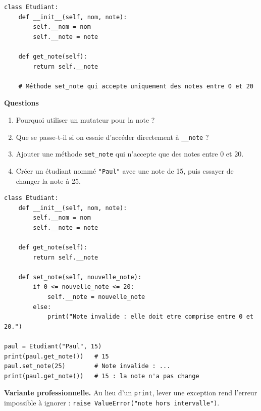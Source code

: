 \documentclass[11pt,a4paper]{article}
\newif\ifcorrige
\newcommand{\py}[1]{\texttt{#1}}
\newcommand{\rep}[1]{%
  \ifcorrige
    \par\smallskip{\color{corr}\small#1}\par\smallskip
  \else
    \par\nobreak\vspace{1mm}\noindent\color{black!55}\dotfill\par
    \noindent\color{black!55}\dotfill\par\color{black}\vspace{1mm}
  \fi}
\newcommand{\zonecode}[1][4cm]{%
  \ifcorrige\else
    \par\smallskip\noindent
    \begin{tcolorbox}[colback=white,colframe=black!45,boxrule=0.5pt,arc=1pt,height=#1]\end{tcolorbox}%
  \fi}
\newenvironment{solution}
  {\ifcorrige
     \begin{tcolorbox}[enhanced,breakable,colback=corrbg,colframe=corr,boxrule=0.6pt,arc=1pt,
       left=5pt,right=5pt,top=4pt,bottom=4pt,
       title={Corrigé},coltitle=corr,fonttitle=\bfseries\small,detach title,
       before upper={\tcbtitle\par\smallskip},fontupper=\small]%
   \else
     \setbox0\vbox\bgroup
   \fi}
  {\ifcorrige\end{tcolorbox}\else\egroup\fi}
\begin{document}
\begin{lstlisting}
class Etudiant:
    def __init__(self, nom, note):
        self.__nom = nom
        self.__note = note

    def get_note(self):
        return self.__note

    # Méthode set_note qui accepte uniquement des notes entre 0 et 20
\end{lstlisting}

\textbf{Questions}
\begin{enumerate}
  \item Pourquoi utiliser un mutateur pour la note ?
    \rep{Pour garantir un \emph{invariant} : une note reste comprise entre 0 et 20. Le mutateur
    est le seul point d'entrée en écriture, il peut donc vérifier la valeur avant de
    l'enregistrer et refuser les valeurs incohérentes.}
  \item Que se passe-t-il si on essaie d'accéder directement à \py{__note} ?
    \rep{Python lève une \py{AttributeError} : à cause du \emph{name mangling}, l'attribut
    s'appelle en réalité \py{_Etudiant__note} et le nom \py{__note} n'existe pas depuis
    l'extérieur.}
  \item Ajouter une méthode \py{set_note} qui n'accepte que des notes entre 0 et 20.
  \item Créer un étudiant nommé \py{"Paul"} avec une note de 15, puis essayer de changer la note
    à 25.
\end{enumerate}
\zonecode[5.5cm]
\begin{solution}
\begin{lstlisting}
class Etudiant:
    def __init__(self, nom, note):
        self.__nom = nom
        self.__note = note

    def get_note(self):
        return self.__note

    def set_note(self, nouvelle_note):
        if 0 <= nouvelle_note <= 20:
            self.__note = nouvelle_note
        else:
            print("Note invalide : elle doit etre comprise entre 0 et 20.")

paul = Etudiant("Paul", 15)
print(paul.get_note())   # 15
paul.set_note(25)        # Note invalide : ...
print(paul.get_note())   # 15 : la note n'a pas change
\end{lstlisting}
\textbf{Variante professionnelle.} Au lieu d'un \py{print}, lever une exception rend l'erreur
impossible à ignorer : \py{raise ValueError("note hors intervalle")}.
\end{solution}
\end{document}
